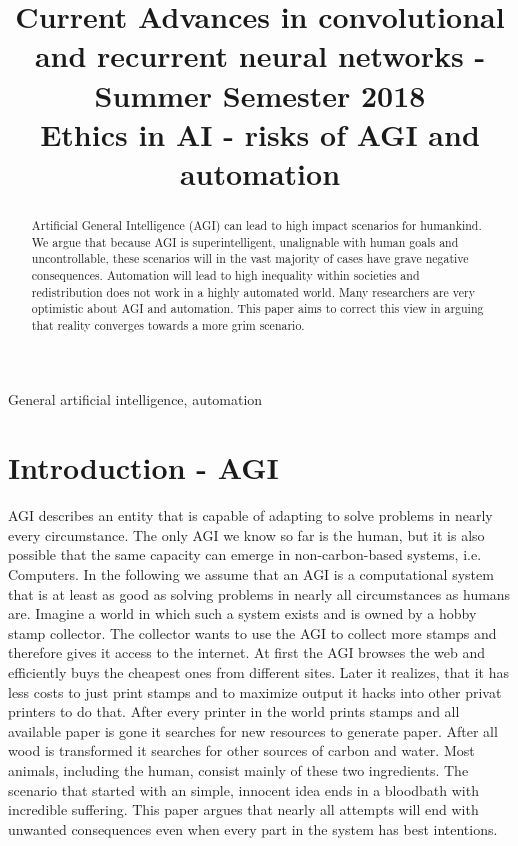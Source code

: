 \documentclass[conference]{IEEEtran}
\begin{document}
\title{
{\large Current Advances in convolutional and recurrent neural networks - Summer Semester 2018} \\
Ethics in AI - risks of AGI and automation
}
\author{
\IEEEauthorblockA{
}
}

\maketitle

\begin{abstract}
Artificial General Intelligence (AGI) can lead to high impact scenarios for humankind. We argue that because AGI is superintelligent, unalignable with human goals and uncontrollable, these scenarios will in the vast majority of cases have grave negative consequences. Automation will lead to high inequality within societies and redistribution does not work in a highly automated world. Many researchers are very optimistic about AGI and automation. This paper aims to correct this view in arguing that reality converges towards a more grim scenario.
\end{abstract}

\begin{IEEEkeywords}
General artificial intelligence, automation
\end{IEEEkeywords}

\section{Introduction - AGI}
%
AGI describes an entity that is capable of adapting to solve problems in nearly every circumstance. The only AGI we know so far is the human, but it is also possible that the same capacity can emerge in non-carbon-based systems, i.e. Computers. In the following we assume that an AGI is a computational system that is at least as good as solving problems in nearly all circumstances as humans are. Imagine a world in which such a system exists and is owned by a hobby stamp collector. The collector wants to use the AGI to collect more stamps and therefore gives it access to the internet. At first the AGI browses the web and efficiently buys the cheapest ones from different sites. Later it realizes, that it has less costs to just print stamps and to maximize output it hacks into other privat printers to do that. After every printer in the world prints stamps and all available paper is gone it searches for new resources to generate paper. After all wood is transformed it searches for other sources of carbon and water. Most animals, including the human, consist mainly of these two ingredients. The scenario that started with an simple, innocent idea ends in a bloodbath with incredible suffering. This paper argues that nearly all attempts will end with unwanted consequences even when every part in the system has best intentions. 
\end{document}
